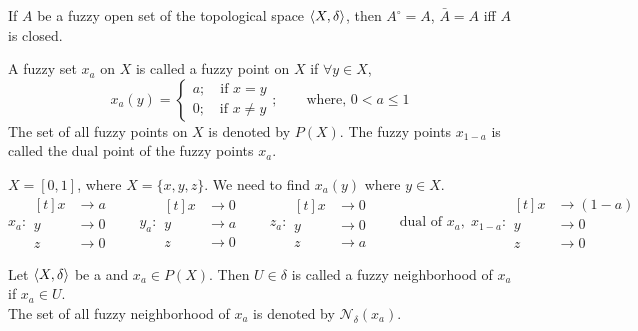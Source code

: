 \documentclass[../main-sheet.tex]{subfiles}
\begin{document}
\begin{note}
    If  \(A \) be a fuzzy open set of the topological space \(\langle X, \delta \rangle\), then \(A^\circ=A \), \(\bar{A }=A \) iff \(A \) is closed.
\end{note}
\begin{defn}
    A fuzzy set \(x_a \) on \(X \) is called a fuzzy point on \(X  \) if \(\forall y\in X \),
    \[x_a(y)=\begin{cases}
        a;\quad\text{if } x=y\\
        0;\quad\text{if } x\neq y
    \end{cases};\qquad \text{where, } 0<a\leq 1
    \]
    The set of all fuzzy points on \(X \) is denoted by \(P(X)\). The fuzzy points \(x_{1-a }\) is called the dual point of the fuzzy points \(x_a\).
\end{defn}
\begin{ex}
    \(X=[0,1]\), where \(X=\{x,y,z \}\). We need to find \(x_a(y )\) where \(y\in X \).\\
    \[
        x_a:\begin{aligned}[t]
        x&\to a\\
        y&\to 0\\
        z&\to 0
    \end{aligned}\qquad
        y_a:\begin{aligned}[t]
        x&\to 0\\
        y&\to a\\
        z&\to 0
    \end{aligned}\qquad
        z_a:\begin{aligned}[t]
        x&\to 0\\
        y&\to 0\\
        z&\to a
    \end{aligned}\qquad
        \text{dual of }x_a,\;x_{1-a}:\begin{aligned}[t]
        x&\to (1-a)\\
        y&\to 0\\
        z&\to 0
    \end{aligned}
    \]
\end{ex}
\begin{defn}
    Let \(\langle X, \delta \rangle\) be a \fts \s and \(x_a\in P(X )\). Then \(U\in\delta\) is called a fuzzy neighborhood of \(x_a \) if \(x_a \in U \).\\
    The set of all fuzzy neighborhood of \(x_a \) is denoted by \(\mathcal{N }_\delta (x_a)\).
\end{defn}
\end{document}
